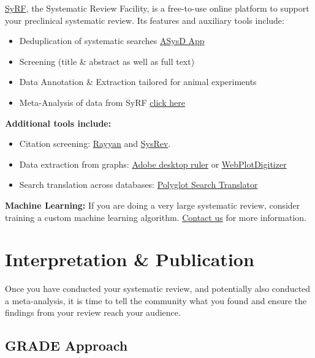 \documentclass[
]{book}
\providecommand{\tightlist}{%
  \setlength{\itemsep}{0pt}\setlength{\parskip}{0pt}}
\begin{document}
\href{https://syrf.org.uk/}{SyRF}, the Systematic Review Facility, is a free-to-use online platform to support your preclinical systematic review. Its features and auxiliary tools include:

\begin{itemize}
\tightlist
\item
  Deduplication of systematic searches \href{https://camarades.shinyapps.io/RDedup/}{ASysD App}
\item
  Screening (title \& abstract as well as full text)
\item
  Data Annotation \& Extraction tailored for animal experiments
\item
  Meta-Analysis of data from SyRF \href{https://camarades.shinyapps.io/meta-analysis-app/}{click here}
\end{itemize}

\textbf{Additional tools include:}

\begin{itemize}
\tightlist
\item
  Citation screening: \href{https://rayyan.qcri.org/welcome}{Rayyan} and \href{https://sysrev.com/}{SysRev}.
\item
  Data extraction from graphs: \href{https://helpx.adobe.com/acrobat/using/grids-guides-measurements-pdfs.html}{Adobe desktop ruler} or \href{https://automeris.io/WebPlotDigitizer/}{WebPlotDigitizer}
\item
  Search translation across databases: \href{https://sr-accelerator.com/\#/polyglot}{Polyglot Search Translator}
\end{itemize}

\textbf{Machine Learning:}
If you are doing a very large systematic review, consider training a custom machine learning algorithm. \href{mailto:camarades.berlin@charite.de}{Contact us} for more information.

\chapter{Interpretation \& Publication}\label{interpretation-publication}

Once you have conducted your systematic review, and potentially also conducted a meta-analysis, it is time to tell the community what you found and ensure the findings from your review reach your audience.

\section{GRADE Approach}\label{grade-approach}
\end{document}

